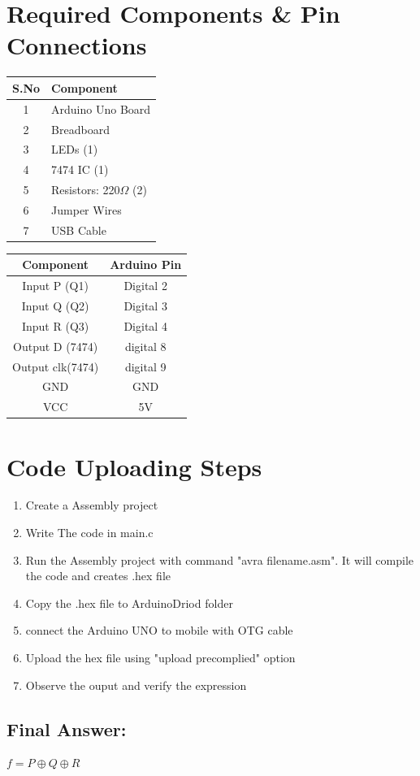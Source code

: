 \documentclass[a4paper,12pt]{article}
\begin{document}
\section*{Required Components \& Pin Connections}
\begin{center}
\begin{minipage}{0.45\textwidth}
\begin{table}[H]
\centering
\begin{tabular}{|c|l|}
\hline
\textbf{S.No} & \textbf{Component} \\ \hline
1 & Arduino Uno Board \\
2 & Breadboard \\
3 & LEDs (1) \\
4 & 7474 IC (1) \\
5 & Resistors: 220$\Omega$ (2) \\
6 & Jumper Wires \\
7 & USB Cable \\
\hline
\end{tabular}
\end{table}
\end{minipage}
\hspace{0.05\textwidth}
\begin{minipage}{0.45\textwidth}
\begin{table}[H]
\centering
\begin{tabular}{|c|c|}
\hline
\textbf{Component} & \textbf{Arduino Pin} \\ \hline
Input P (Q1) & Digital 2 \\
Input Q (Q2) & Digital 3 \\
Input R (Q3) & Digital 4 \\
Output D (7474) & digital 8\\
Output clk(7474) & digital 9\\ 
GND & GND \\
VCC & 5V \\
\hline
\end{tabular}
\end{table}
\end{minipage}
\end{center}
\newpage
\section*{Code Uploading Steps}
\begin{enumerate}
	\item Create a Assembly  project
	\item Write The code in main.c
	\item Run the Assembly project with command "avra filename.asm". It will compile the code and creates .hex file
	\item Copy the .hex file to ArduinoDriod folder
	\item connect the Arduino UNO to mobile with OTG cable
	\item Upload the hex file using "upload precomplied" option
	\item Observe the ouput and verify the expression
\end{enumerate}
\subsection*{Final Answer:}

$
\boxed{f = P \oplus Q \oplus R}
$
\end{document}
